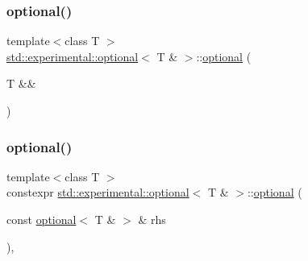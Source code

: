 \mbox{\label{classstd_1_1experimental_1_1optional_3_01_t_01_6_01_4_ad7d66f5c33a6fb9ca9c0fdb25f61036e}} 
\subsubsection{\texorpdfstring{optional()}{optional()}\hspace{0.1cm}{\footnotesize\ttfamily [4/7]}}
{\footnotesize\ttfamily template$<$class T $>$ \\
\mbox{\hyperlink{classstd_1_1experimental_1_1optional}{std\+::experimental\+::optional}}$<$ T \& $>$\+::\mbox{\hyperlink{classstd_1_1experimental_1_1optional}{optional}} (\begin{DoxyParamCaption}\item[{T \&\&}]{ }\end{DoxyParamCaption})\hspace{0.3cm}{\ttfamily [delete]}}

\mbox{\label{classstd_1_1experimental_1_1optional_3_01_t_01_6_01_4_ad9dc3e3c32f40151798d6ce2f0435b0d}} 
\subsubsection{\texorpdfstring{optional()}{optional()}\hspace{0.1cm}{\footnotesize\ttfamily [5/7]}}
{\footnotesize\ttfamily template$<$class T $>$ \\
constexpr \mbox{\hyperlink{classstd_1_1experimental_1_1optional}{std\+::experimental\+::optional}}$<$ T \& $>$\+::\mbox{\hyperlink{classstd_1_1experimental_1_1optional}{optional}} (\begin{DoxyParamCaption}\item[{const \mbox{\hyperlink{classstd_1_1experimental_1_1optional}{optional}}$<$ T \& $>$ \&}]{rhs }\end{DoxyParamCaption})\hspace{0.3cm}{\ttfamily [inline]}, {\ttfamily [noexcept]}}

